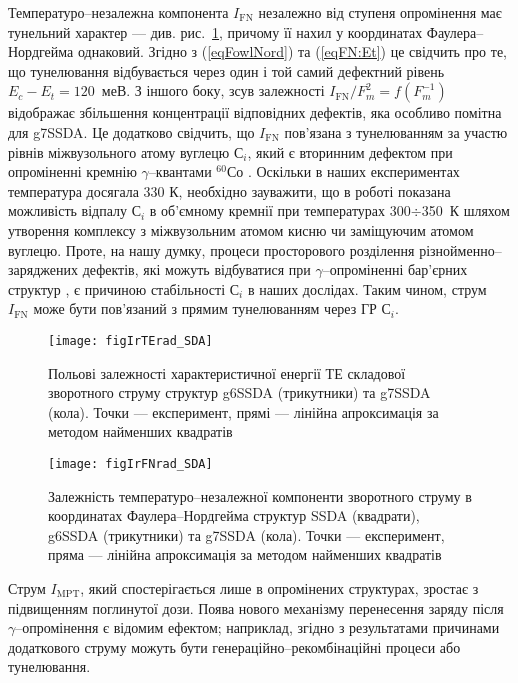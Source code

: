 Температуро--незалежна компонента $I_\mathrm{FN}$ незалежно від ступеня опромінення має тунельний характер --- див. рис.~\ref{figIrTErad_SDA},
причому її нахил у координатах Фаулера--Нордгейма однаковий.
Згідно з (\ref{eqFowlNord}) та (\ref{eqFN:Et}) це свідчить про те, що тунелювання відбувається через один і той самий дефектний рівень $E_c-E_t=120$~меВ.
З іншого боку,
зсув залежності $I_\mathrm{FN}/F_m^2=f(F_m^{-1})$ відображає збільшення концентрації відповідних дефектів, яка
особливо помітна для g7SSDA.
Це додатково свідчить, що $I_\mathrm{FN}$ пов'язана з тунелюванням за участю рівнів міжвузольного атому вуглецю С$_i$,
який є вторинним дефектом при опроміненні кремнію $\gamma$--квантами $^{60}$Со \cite{Vavilov1990r}.
Оскільки в наших експериментах температура досягала 330 К, необхідно зауважити, що в роботі \cite{Song1987} показана можливість відпалу С$_i$
 в об’ємному кремнії при температурах 300$\div$350~К шляхом утворення комплексу з міжвузольним атомом кисню чи заміщуючим атомом вуглецю.
Проте, на нашу думку, процеси просторового розділення різнойменно--заряджених дефектів, які можуть відбуватися при $\gamma$--опроміненні бар’єрних структур \cite{Muzafarova}, є причиною стабільності С$_i$ в наших дослідах.
Таким чином, струм $I_\mathrm{FN}$ може бути пов'язаний з прямим  тунелюванням через ГР С$_i$.

\begin{figure}
\center
\texttt{[image: figIrTErad\_SDA]}
\caption{\label{figIrTErad_SDA}
Польові залежності характеристичної енергії ТЕ складової зворотного струму структур g6SSDA (трикутники) та g7SSDA (кола).
Точки --- експеримент, прямі --- лінійна апроксимація за методом найменших квадратів
}%
\end{figure}


\begin{figure}
\center
\texttt{[image: figIrFNrad\_SDA]}
\caption{\label{figIrFNrad_SDA}
Залежність температуро--незалежної компоненти зворотного струму
в координатах Фаулера--Нордгейма
структур SSDA (квадрати), g6SSDA (трикутники) та g7SSDA (кола).
Точки --- експеримент, пряма --- лінійна апроксимація за методом найменших квадратів
}%
\end{figure}


Струм $I_\mathrm{MPT}$, який спостерігається лише в опромінених структурах, зростає з підвищенням поглинутої дози.
Поява нового механізму перенесення заряду після $\gamma$--опромінення є відомим ефектом;
наприклад, згідно з результатами \cite{Gullu:2008,Karatas:2005NIMA} причинами додаткового струму можуть бути генераційно--рекомбінаційні процеси або
тунелювання.

